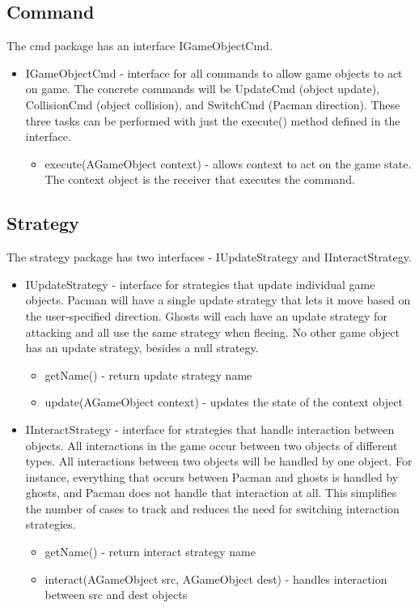 \documentclass[letterpaper, 11pt]{article}
\begin{document}
\subsection{Command}
The cmd package has an interface IGameObjectCmd.
\begin{itemize}
  \item IGameObjectCmd - interface for all commands to allow game objects to act on game. The concrete commands will be UpdateCmd (object update), CollisionCmd (object collision), and SwitchCmd (Pacman direction). These three tasks can be performed with just the execute() method defined in the interface. 
  \begin{itemize}
    \item execute(AGameObject context) - allows context to act on the game state. The context object is the receiver that executes the command.
  \end{itemize}
\end{itemize}

\subsection{Strategy}
The strategy package has two interfaces - IUpdateStrategy and IInteractStrategy. 
\begin{itemize}
  \item IUpdateStrategy - interface for strategies that update individual game objects. Pacman will have a single update strategy that lets it move based on the user-specified direction. Ghosts will each have an update strategy for attacking and all use the same strategy when fleeing. No other game object has an update strategy, besides a null strategy.
  \begin{itemize}
    \item getName() - return update strategy name
    \item update(AGameObject context) - updates the state of the context object
  \end{itemize}  
  \item IInteractStrategy - interface for strategies that handle interaction between objects. All interactions in the game occur between two objects of different types. All interactions between two objects will be handled by one object. For instance, everything that occurs between Pacman and ghosts is handled by ghosts, and Pacman does not handle that interaction at all. This simplifies the number of cases to track and reduces the need for switching interaction strategies.
  \begin{itemize}
    \item getName() - return interact strategy name
    \item interact(AGameObject src, AGameObject dest) - handles interaction between src and dest objects
  \end{itemize}
\end{itemize}
\end{document}
